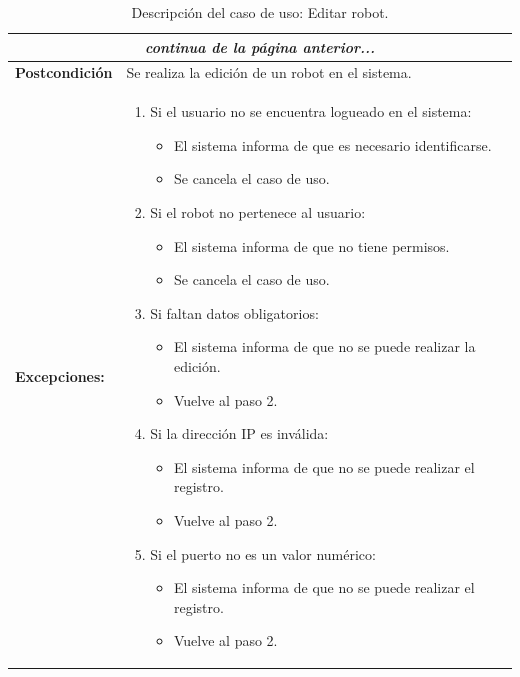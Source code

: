 \begin{table}[H]
  \begin{center}
    \begin{tabular}{|p{3.5cm}|p{10cm}|}
     \multicolumn{2}{c}{\emph{continua de la página anterior...}}\\
     \hline
     {\textbf{Postcondición}} & {Se realiza la edición de un robot en el sistema.}\\
     \hline
         {\textbf{Excepciones:}} & {
         \begin{enumerate}
         
	  \item Si el usuario no se encuentra logueado en el sistema:
	  \begin{itemize}
	    \item El sistema informa de que es necesario identificarse.
	    \item Se cancela el caso de uso.
	  \end{itemize}
      
	  \item Si el robot no pertenece al usuario:
	  \begin{itemize}
	    \item El sistema informa de que no tiene permisos.
	    \item Se cancela el caso de uso.
	  \end{itemize}
	  
         
          \item Si faltan datos obligatorios:
	  \begin{itemize}
	    \item El sistema informa de que no se puede realizar la edición.
	    \item Vuelve al paso 2.
	  \end{itemize}
	    
	  \item Si la dirección IP es inválida:
	  \begin{itemize}
	    \item El sistema informa de que no se puede realizar el registro.
	    \item Vuelve al paso 2.
	  \end{itemize}
	   
	  \item Si el puerto no es un valor numérico:
	   \begin{itemize}
	      \item El sistema informa de que no se puede realizar el registro.
	      \item Vuelve al paso 2.
	   \end{itemize}
	   
         \end{enumerate}
         }\\
     \hline
    \end{tabular}
  \end{center}
\caption{Descripción del caso de uso: Editar robot.}
\end{table}





